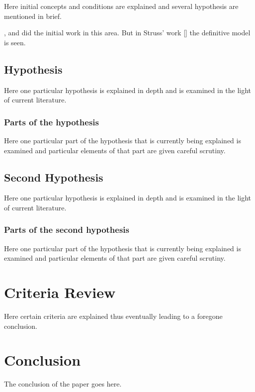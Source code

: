 \documentclass[
  12pt,
  notitlepage]{isuthesis}
\begin{document}
Here initial concepts and conditions are explained and
several hypothesis are mentioned in brief.

\cite{allen}, \cite{bruner} and \cite{cox}
did the initial work in this area. But in Struss' work {[}\cite{struss}{]}
the definitive model is seen.

\subsection{Hypothesis}

Here one particular hypothesis is explained in depth
and is examined in the light of current literature.

\subsubsection{Parts of the hypothesis}

Here one particular part of the hypothesis that is
currently being explained is examined and particular
elements of that part are given careful scrutiny.

\subsection{Second Hypothesis}

Here one particular hypothesis is explained in depth
and is examined in the light of current literature.

\subsubsection{Parts of the second hypothesis}

Here one particular part of the hypothesis that is
currently being explained is examined and particular
elements of that part are given careful scrutiny.

\section{Criteria Review}

Here certain criteria are explained thus eventually
leading to a foregone conclusion.

\section{Conclusion}\label{conclusion}

The conclusion of the paper goes here.
\cite{cox}
\end{document}
